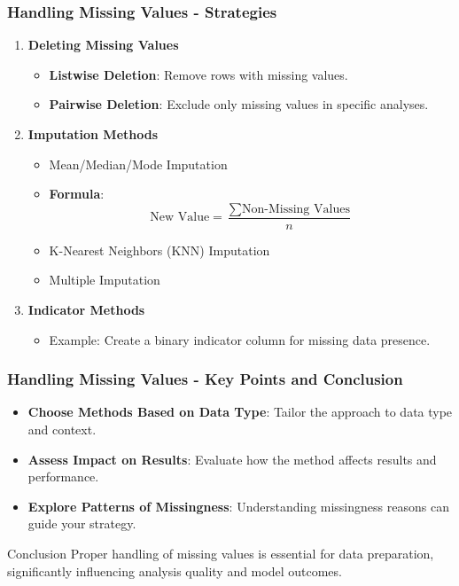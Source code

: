 \documentclass[aspectratio=169]{beamer}
\begin{document}
\begin{frame}[fragile]
    \frametitle{Handling Missing Values - Strategies}
    \begin{enumerate}
        \item \textbf{Deleting Missing Values}
            \begin{itemize}
                \item \textbf{Listwise Deletion}: Remove rows with missing values.
                \item \textbf{Pairwise Deletion}: Exclude only missing values in specific analyses.
            \end{itemize}
        
        \item \textbf{Imputation Methods}
            \begin{itemize}
                \item Mean/Median/Mode Imputation
                \item \textbf{Formula}:
                \[
                \text{New Value} = \frac{\sum \text{Non-Missing Values}}{n}
                \]
                \item K-Nearest Neighbors (KNN) Imputation
                \item Multiple Imputation
            \end{itemize}
        
        \item \textbf{Indicator Methods}
            \begin{itemize}
                \item Example: Create a binary indicator column for missing data presence.
            \end{itemize}
    \end{enumerate}
\end{frame}

\begin{frame}[fragile]
    \frametitle{Handling Missing Values - Key Points and Conclusion}
    \begin{itemize}
        \item \textbf{Choose Methods Based on Data Type}: Tailor the approach to data type and context.
        \item \textbf{Assess Impact on Results}: Evaluate how the method affects results and performance.
        \item \textbf{Explore Patterns of Missingness}: Understanding missingness reasons can guide your strategy.
    \end{itemize}
    
    \begin{block}{Conclusion}
        Proper handling of missing values is essential for data preparation, significantly influencing analysis quality and model outcomes.
    \end{block}
\end{frame}
\end{document}

